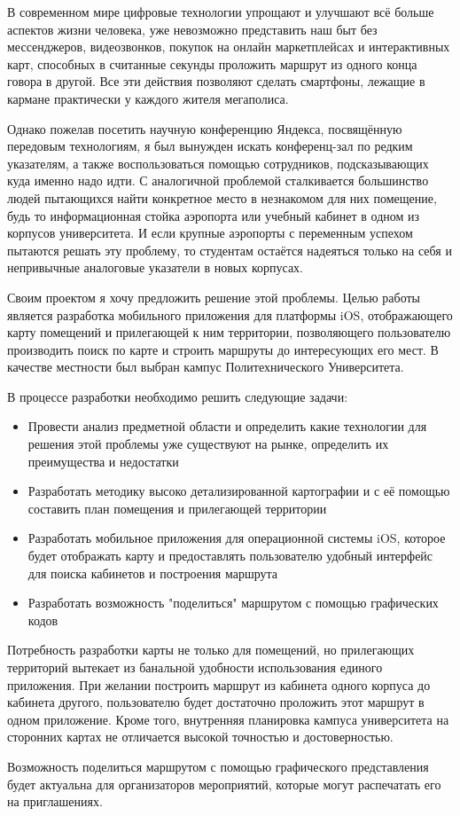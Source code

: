 В современном мире цифровые технологии упрощают и улучшают всё больше аспектов жизни человека, уже невозможно представить наш быт без мессенджеров, видеозвонков, покупок на онлайн маркетплейсах и интерактивных карт, способных в считанные секунды проложить маршрут из одного конца говора в другой. Все эти действия позволяют сделать смартфоны, лежащие в кармане практически у каждого жителя мегаполиса.

Однако пожелав посетить научную конференцию Яндекса, посвящённую передовым технологиям, я был вынужден искать конференц-зал по редким указателям, а также воспользоваться помощью сотрудников, подсказывающих куда именно надо идти. С аналогичной проблемой сталкивается большинство людей пытающихся найти конкретное место в незнакомом для них помещение, будь то информационная стойка аэропорта или учебный кабинет в одном из корпусов университета.
И если крупные аэропорты с переменным успехом пытаются решать эту проблему, то студентам остаётся надеяться только на себя и непривычные аналоговые указатели в новых корпусах.

Своим проектом я хочу предложить решение этой проблемы. Целью работы является разработка мобильного приложения для платформы iOS, отображающего карту помещений и прилегающей к ним территории, позволяющего пользователю производить поиск по карте и строить маршруты до интересующих его мест. В качестве местности был выбран кампус Политехнического Университета.

В процессе разработки необходимо решить следующие задачи:
\begin{itemize}
  \item Провести анализ предметной области и определить какие технологии для решения этой проблемы уже существуют на рынке, определить их преимущества и недостатки
  \item Разработать методику высоко детализированной картографии и с её помощью составить план помещения и прилегающей территории
  \item Разработать мобильное приложения для операционной системы iOS, которое будет отображать карту и предоставлять пользователю удобный интерфейс для поиска кабинетов и построения маршрута
  \item Разработать возможность "поделиться" маршрутом с помощью графических кодов
\end{itemize}

Потребность разработки карты не только для помещений, но прилегающих территорий вытекает из банальной удобности использования единого приложения. При желании построить маршрут из кабинета одного корпуса до кабинета другого, пользователю будет достаточно проложить этот маршрут в одном приложение. Кроме того, внутренняя планировка кампуса университета на сторонних картах не отличается высокой точностью и достоверностью.

Возможность поделиться маршрутом с помощью графического представления будет актуальна для организаторов мероприятий, которые могут распечатать его на приглашениях.
